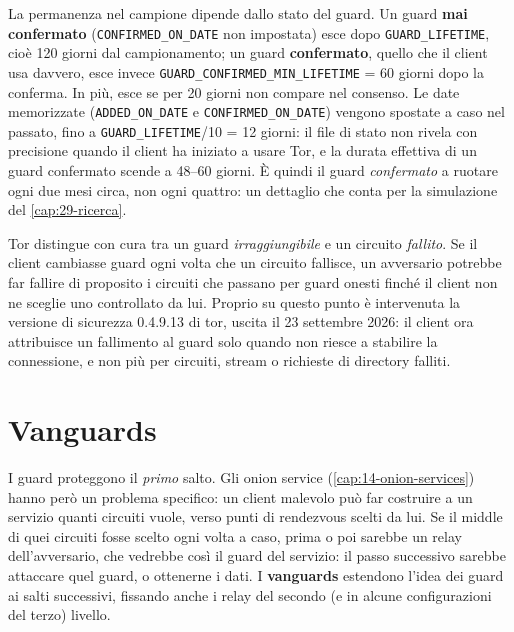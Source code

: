 La permanenza nel campione dipende dallo stato del guard. Un guard \textbf{mai confermato} (\texttt{CONFIRMED\_ON\_DATE} non impostata) esce dopo \texttt{GUARD\_LIFETIME}, cioè 120 giorni dal campionamento; un guard \textbf{confermato}, quello che il client usa davvero, esce invece \texttt{GUARD\_CONFIRMED\_MIN\_LIFETIME} = 60 giorni dopo la conferma. In più, esce se per 20 giorni non compare nel consenso. Le date memorizzate (\texttt{ADDED\_ON\_DATE} e \texttt{CONFIRMED\_ON\_DATE}) vengono spostate a caso nel passato, fino a \texttt{GUARD\_LIFETIME}/10 = 12 giorni: il file di stato non rivela con precisione quando il client ha iniziato a usare Tor, e la durata effettiva di un guard confermato scende a 48--60 giorni. È quindi il guard \emph{confermato} a ruotare ogni due mesi circa, non ogni quattro: un dettaglio che conta per la simulazione del \cref{cap:29-ricerca}.

\begin{attenzione}
Tor distingue con cura tra un guard \emph{irraggiungibile} e un circuito \emph{fallito}. Se il client cambiasse guard ogni volta che un circuito fallisce, un avversario potrebbe far fallire di proposito i circuiti che passano per guard onesti finché il client non ne sceglie uno controllato da lui. Proprio su questo punto è intervenuta la versione di sicurezza 0.4.9.13 di tor, uscita il 23 settembre 2026: il client ora attribuisce un fallimento al guard solo quando non riesce a stabilire la connessione, e non più per circuiti, stream o richieste di directory falliti.
\end{attenzione}

\section{Vanguards}\label{sec:vanguards}

I guard proteggono il \emph{primo} salto. Gli onion service (\cref{cap:14-onion-services}) hanno però un problema specifico: un client malevolo può far costruire a un servizio quanti circuiti vuole, verso punti di rendezvous scelti da lui. Se il middle di quei circuiti fosse scelto ogni volta a caso, prima o poi sarebbe un relay dell'avversario, che vedrebbe così il guard del servizio: il passo successivo sarebbe attaccare quel guard, o ottenerne i dati. I \textbf{vanguards} estendono l'idea dei guard ai salti successivi, fissando anche i relay del secondo (e in alcune configurazioni del terzo) livello.

